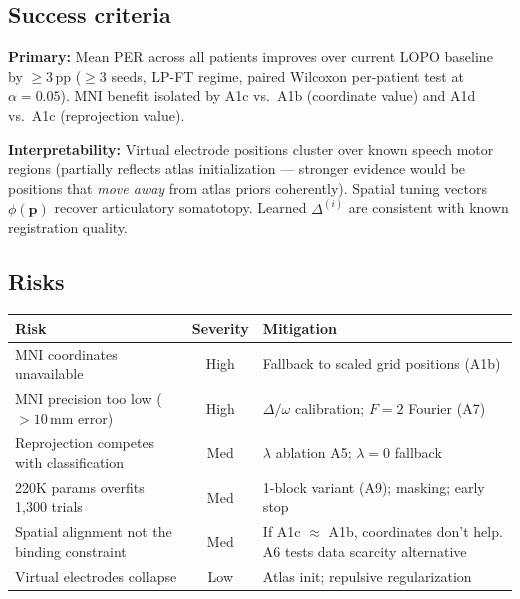 \documentclass[11pt,letterpaper]{article}
\newcommand{\bfp}{\mathbf{p}}
\newcommand{\pp}{\,\text{pp}}
\begin{document}
\subsection{Success criteria}

\textbf{Primary:} Mean PER across all patients improves over current LOPO baseline by $\geq 3\pp$ ($\geq 3$ seeds, LP-FT regime, paired Wilcoxon per-patient test at $\alpha{=}0.05$). MNI benefit isolated by A1c vs.\ A1b (coordinate value) and A1d vs.\ A1c (reprojection value).

\textbf{Interpretability:} Virtual electrode positions cluster over known speech motor regions (partially reflects atlas initialization --- stronger evidence would be positions that \textit{move away} from atlas priors coherently). Spatial tuning vectors $\phi(\bfp)$ recover articulatory somatotopy. Learned $\Delta^{(i)}$ are consistent with known registration quality.

\subsection{Risks}

\begin{table}[ht!]\centering\small
\begin{tabular}{@{}p{}cp{}@{}}
\toprule
\textbf{Risk} & \textbf{Severity} & \textbf{Mitigation} \\
\midrule
MNI coordinates unavailable & High & Fallback to scaled grid positions (A1b) \\
MNI precision too low ($>10$\,mm error) & High & $\Delta/\omega$ calibration; $F{=}2$ Fourier (A7) \\
Reprojection competes with classification & Med & $\lambda$ ablation A5; $\lambda{=}0$ fallback \\
220K params overfits 1{,}300 trials & Med & 1-block variant (A9); masking; early stop \\
Spatial alignment not the binding constraint & Med & If A1c $\approx$ A1b, coordinates don't help. A6 tests data scarcity alternative \\
Virtual electrodes collapse & Low & Atlas init; repulsive regularization \\
\bottomrule
\end{tabular}
\end{table}


\end{document}
